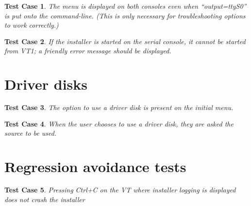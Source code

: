 \documentclass[a4paper]{article}
\newtheorem{testcase}{Test Case}
\begin{document}
\begin{testcase}
The menu is displayed on both consoles even when ``output=ttyS0'' is
put onto the command-line.  (This is only necessary for
troubleshooting options to work correctly.)
\end{testcase}

\begin{testcase}
If the installer is started on the serial console, it cannot be
started from VT1; a friendly error message should be displayed.
\end{testcase}

\section{Driver disks}

\begin{testcase}
The option to use a driver disk is present on the initial menu.
\end{testcase}

\begin{testcase}
When the user chooses to use a driver disk, they are asked the source
to be used.
\end{testcase}

\section{Regression avoidance tests}

\begin{testcase}
Pressing Ctrl+C on the VT where installer logging is displayed does
not crash the installer
\end{testcase}
\end{document}
